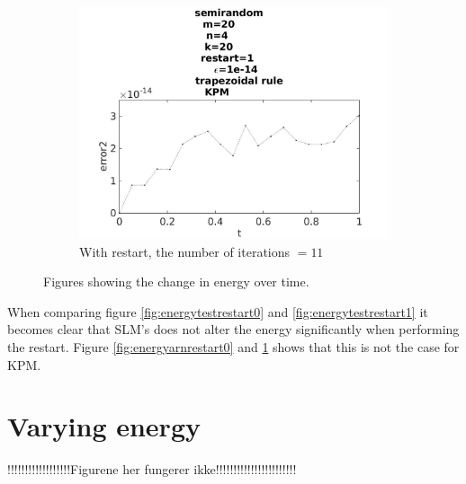 \begin{figure}[H]
\begin{subfigure}[b]{0.3\textwidth}
                \includegraphics[width=\textwidth]{../MATLAB/fig/errorarnrestart1.jpg}
                \caption{ With restart, the number of iterations $ = 11$ }
                \label{fig:energyarnrestart1}
        \end{subfigure}
        \caption{ Figures showing the change in energy over time. }
        \label{fig:energyarnrestart}
\end{figure}

When comparing figure \ref{fig:energytestrestart0} and \ref{fig:energytestrestart1} it becomes clear that SLM's does not alter the energy significantly when performing the restart. Figure \ref{fig:energyarnrestart0} and \ref{fig:energyarnrestart1} shows that this is not the case for KPM.\\


\section{Varying energy}
!!!!!!!!!!!!!!!!!!Figurene her fungerer ikke!!!!!!!!!!!!!!!!!!!!!!!\\

